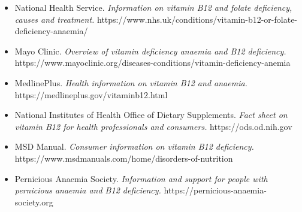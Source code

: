\begin{itemize}
    \item National Health Service. \textit{Information on vitamin B12 and folate deficiency, causes and treatment.} https://www.nhs.uk/conditions/vitamin-b12-or-folate-deficiency-anaemia/
    \item Mayo Clinic. \textit{Overview of vitamin deficiency anaemia and B12 deficiency.} https://www.mayoclinic.org/diseases-conditions/vitamin-deficiency-anemia
    \item MedlinePlus. \textit{Health information on vitamin B12 and anaemia.} https://medlineplus.gov/vitaminb12.html
    \item National Institutes of Health Office of Dietary Supplements. \textit{Fact sheet on vitamin B12 for health professionals and consumers.} https://ods.od.nih.gov
    \item MSD Manual. \textit{Consumer information on vitamin B12 deficiency.} https://www.msdmanuals.com/home/disorders-of-nutrition
    \item Pernicious Anaemia Society. \textit{Information and support for people with pernicious anaemia and B12 deficiency.} https://pernicious-anaemia-society.org
\end{itemize}
